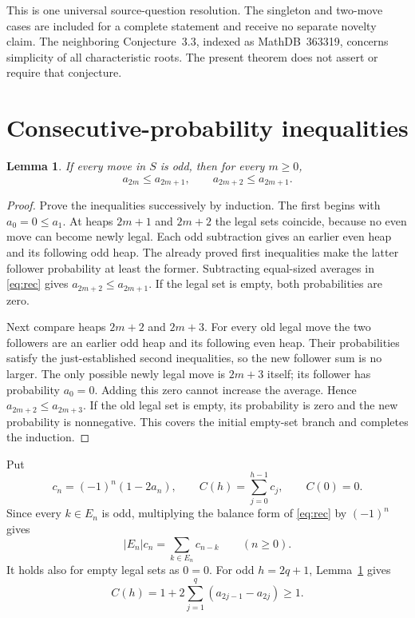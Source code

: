 \documentclass[11pt]{article}
\newtheorem{lemma}[theorem]{Lemma}
\begin{document}
This is one universal source-question resolution. The singleton and
two-move cases are included for a complete statement and receive no
separate novelty claim. The neighboring Conjecture~3.3, indexed as
MathDB~363319, concerns simplicity of all characteristic roots. The
present theorem does not assert or require that conjecture.

\section{Consecutive-probability inequalities}
\begin{lemma}\label{lem:zigzag}
If every move in $S$ is odd, then for every $m\geq0$,
\[
 a_{2m}\leq a_{2m+1},\qquad a_{2m+2}\leq a_{2m+1}.
\]
\end{lemma}
\begin{proof}
Prove the inequalities successively by induction. The first begins with
$a_0=0\leq a_1$. At heaps $2m+1$ and $2m+2$ the legal sets coincide,
because no even move can become newly legal. Each odd subtraction gives
an earlier even heap and its following odd heap. The already proved first
inequalities make the latter follower probability at least the former.
Subtracting equal-sized averages in \eqref{eq:rec} gives
$a_{2m+2}\leq a_{2m+1}$. If the legal set is empty, both probabilities
are zero.

Next compare heaps $2m+2$ and $2m+3$. For every old legal move the two
followers are an earlier odd heap and its following even heap. Their
probabilities satisfy the just-established second inequalities, so the
new follower sum is no larger. The only possible newly legal move is
$2m+3$ itself; its follower has probability $a_0=0$. Adding this zero
cannot increase the average. Hence $a_{2m+2}\leq a_{2m+3}$.
If the old legal set is empty, its probability is zero and the new
probability is nonnegative. This covers the initial empty-set branch and
completes the induction.
\end{proof}

Put
\[
 c_n=(-1)^n(1-2a_n),\qquad C(h)=\sum_{j=0}^{h-1}c_j,
 \qquad C(0)=0.
\]
Since every $k\in E_n$ is odd, multiplying the balance form of
\eqref{eq:rec} by $(-1)^n$ gives
\begin{equation}\label{eq:center}
 |E_n|c_n=\sum_{k\in E_n}c_{n-k}\qquad(n\geq0).
\end{equation}
It holds also for empty legal sets as $0=0$. For odd $h=2q+1$,
Lemma~\ref{lem:zigzag} gives
\begin{equation}\label{eq:prefix}
 C(h)=1+2\sum_{j=1}^{q}(a_{2j-1}-a_{2j})\geq1.
\end{equation}
\end{document}
